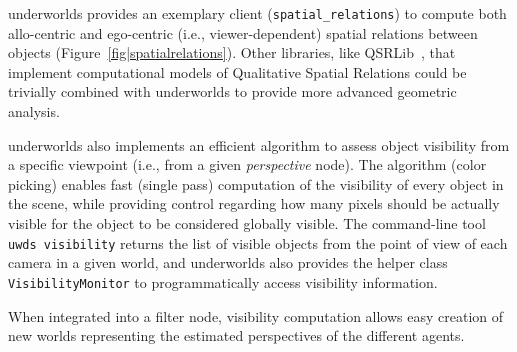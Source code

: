 \documentclass[letterpaper, 10pt, conference]{ieeeconf}
\newcommand{\ie}{i.e.,\xspace}
\newcommand{\uwds}{{\sc underworlds}\xspace}
\begin{document}
\uwds provides an exemplary client ({\tt spatial\_relations}) to compute both
allo-centric and ego-centric (\ie viewer-dependent) spatial relations
between objects (Figure~\ref{fig|spatialrelations}).
Other libraries, like QSRLib~\cite{gatsoulis2016qsrlib}, that implement
computational models of Qualitative Spatial Relations could be trivially
combined with \uwds to provide more advanced geometric analysis.


\uwds also implements an efficient algorithm to assess object visibility from a
specific viewpoint (\ie from a given \emph{perspective} node). The algorithm (color
picking) enables fast (single pass) computation of the visibility of every
object in the scene, while providing control regarding how many pixels should be actually
visible for the object to be considered globally visible. The
command-line tool {\tt uwds visibility} returns the list of visible objects from
the point of view of each camera in a given world, and \uwds also provides the
helper class {\tt VisibilityMonitor} to programmatically access visibility
information.

When integrated into a filter node, visibility computation allows easy
creation of new worlds representing the estimated perspectives of the different
agents.

%
%
%
%
%
%
%
%
%
%
%
%
%
%
%
%
\end{document}
